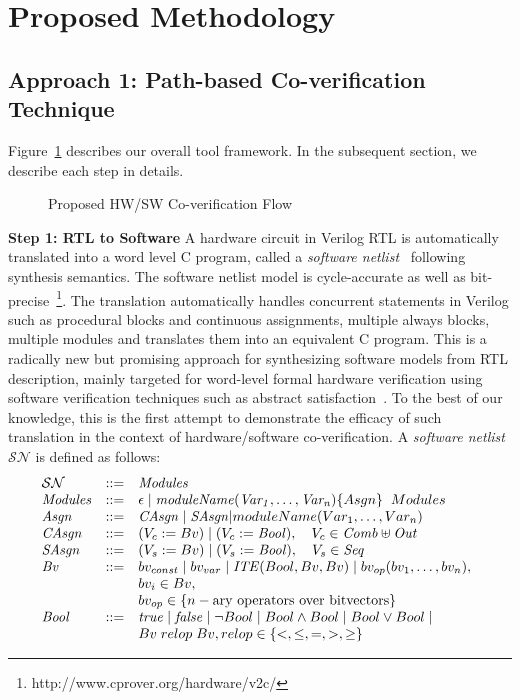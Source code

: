 \documentclass[sigconf]{acmart}
\begin{document}
\section{Proposed Methodology}
%
\subsection{Approach 1: Path-based Co-verification Technique}
%
Figure~\ref{proposed-flow} describes our overall tool framework. In the
subsequent section, we describe each step in details.\\ 
%
\begin{figure}[t]
{}
\caption{Proposed HW/SW Co-verification Flow
\label{proposed-flow}}
\end{figure}
%
\textbf{Step 1: RTL to Software}
A hardware circuit in Verilog RTL is automatically 
translated into a word level C program, called a 
\textit{software netlist}~\cite{mtk2016,mskm2016,mkm2015} following synthesis 
semantics. The software netlist model is cycle-accurate as well as 
bit-precise~\footnote{http://www.cprover.org/hardware/v2c/}. The 
translation automatically handles concurrent statements 
in Verilog such as procedural blocks and continuous assignments, multiple always
blocks, multiple modules and translates them into an equivalent C program.  This
is a radically new but promising approach for synthesizing software 
models from RTL description, mainly targeted for word-level formal hardware 
verification using software verification techniques such as abstract 
satisfaction~\cite{leo-thesis}.  To the best of our knowledge, this is the first 
attempt to demonstrate the efficacy of such translation in the context of 
hardware/software co-verification. 
% 
A \textit{software netlist} $\mathcal{SN}$ is defined as follows:
%
\[ 
\begin{array}[t]{@{}lll}
\mathcal{SN} & {:}{:}{=} & \mathit{Modules} \\
\mathit{Modules} & {:}{:}{=} & \epsilon \mid \mathit{moduleName(Var_1,\dots,Var_n)} \{ Asgn \} \;\; Modules \\
\mathit{Asgn} &  {:}{:}{=} & \mathit{CAsgn} \mid \mathit{SAsgn} | moduleName(Var_1,\dots,Var_n)\\
\mathit{CAsgn} & {:}{:}{=} & (V_c := Bv) \mid (V_c := \mathit{Bool}), \quad V_c \in \mathit{Comb} \uplus \mathit{Out} \\
\mathit{SAsgn} & {:}{:}{=} & (V_s := Bv) \mid (V_s := \mathit{Bool}), \quad V_s \in \mathit{Seq} \\
\mathit{Bv} &  {:}{:}{=} & bv_{const} \mid bv_{var} \mid
	\mathit{ITE}(Bool, Bv, Bv) \mid
bv_{op}(bv_1, \ldots, bv_n), \\
& & bv_i \in Bv, \\ 
& & bv_{op} \in \{n-\text{ary operators over bitvectors} \} \\
\mathit{Bool} & {:}{:}{=} & \mathit{true} \mid \mathit{false} \mid \neg{Bool} \mid Bool \land Bool \mid 
Bool \lor Bool \mid \\ 
& & Bv\; relop\; Bv, relop \in \{<,\leq,=,>,\geq\} \\
\end{array}
\]
\end{document}
